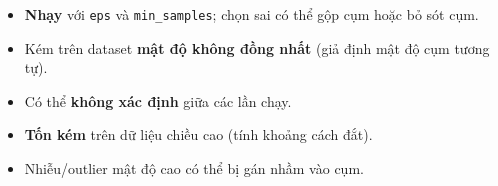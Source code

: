\begin{luuy}[title={Nhược điểm}]
\begin{itemize}
  \item \textbf{Nhạy} với \texttt{eps} và \texttt{min\_samples}; chọn sai có thể gộp cụm hoặc bỏ sót cụm.
  \item Kém trên dataset \textbf{mật độ không đồng nhất} (giả định mật độ cụm tương tự).
  \item Có thể \textbf{không xác định} giữa các lần chạy.
  \item \textbf{Tốn kém} trên dữ liệu chiều cao (tính khoảng cách đắt).
  \item Nhiễu/outlier mật độ cao có thể bị gán nhầm vào cụm.
\end{itemize}
\end{luuy}
